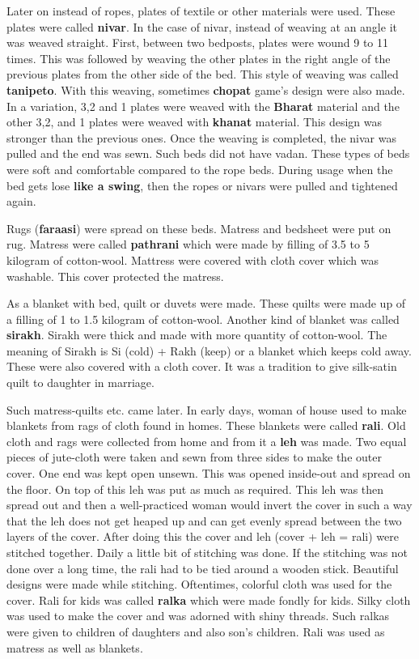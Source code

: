 Later on instead of ropes, plates of textile or other materials were used. These
plates were called \textbf{nivar}. In the case of nivar, instead of weaving at
an angle it was weaved straight. First, between two bedposts, plates
were wound 9 to 11 times. This was followed by weaving the other plates in the
right angle of the previous plates from the other side of the bed. This style of
weaving was called \textbf{tanipeto}. With this weaving, sometimes
\textbf{chopat} game's design were also made. In a variation, 3,2 and 1 plates
were weaved with the \textbf{Bharat} material and the other 3,2, and 1 plates
were weaved with \textbf{khanat} material. This design was stronger than the
previous ones. Once the weaving is completed, the nivar was pulled and the end
was sewn. Such beds did not have vadan. These types of beds were soft and
comfortable compared to the rope beds. During usage when the bed gets lose
\textbf{like a swing}, then the ropes or nivars were pulled and tightened again.

Rugs (\textbf{faraasi}) were spread on these beds. Matress and bedsheet were put
on rug. Matress were called \textbf{pathrani} which were made by filling of 3.5
to 5 kilogram of cotton-wool. Mattress were covered with cloth cover which was
washable. This cover protected the matress. 

As a blanket with bed, quilt or duvets were made. These quilts were made up of a
filling of 1 to 1.5 kilogram of cotton-wool. Another kind of blanket was called
\textbf{sirakh}. Sirakh were thick and made with more quantity of cotton-wool.
The meaning of Sirakh is Si (cold) + Rakh (keep) or a blanket which keeps cold
away. These were also covered with a cloth cover. It was a tradition to give
silk-satin quilt to daughter in marriage. 

Such matress-quilts etc. came later. In early days, woman of house used to make
blankets from rags of cloth found in homes. These blankets were called
\textbf{rali}. Old cloth and rags were collected from home and from it a
\textbf{leh} was made. Two equal pieces of jute-cloth were taken and sewn from
three sides to make the outer cover. One end was kept open unsewn. This  was
opened inside-out and spread on the floor. On top of this leh was put as much as
required. This leh was then spread out and then a well-practiced woman would
invert the cover in such a way that the leh does not get heaped up and can get
evenly spread between the two layers of the cover. After doing this the cover
and leh (cover + leh = rali) were stitched together. Daily a little bit of
stitching was done. If the stitching was not done over a long time, the rali had to be tied
around a wooden stick. Beautiful designs were made while stitching. Oftentimes,
colorful cloth was used for the cover. Rali for kids was called \textbf{ralka}
which were made fondly for kids. Silky cloth was used to make the cover and was
adorned with shiny threads. Such ralkas were given to children of daughters and
also son's children. Rali was used as matress as well as blankets. 

